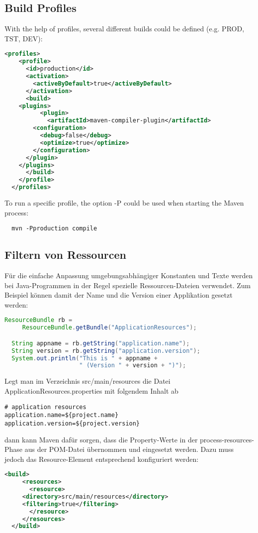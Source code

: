 \subsection{Build Profiles}
With the help of profiles, several different builds could be defined (e.g. PROD, TST, DEV):
\begin{lstlisting}[language=xml,
  morekeywords={profiles,profile,id,build,plugins,plugin,artifactId,
    configuration,debug,optimize}]
  <profiles>
    <profile>
      <id>production</id>
      <activation>
        <activeByDefault>true</activeByDefault>
      </activation>
      <build>
	<plugins>
          <plugin>
            <artifactId>maven-compiler-plugin</artifactId>
	    <configuration>
	      <debug>false</debug>
	      <optimize>true</optimize>
	    </configuration>
	  </plugin>
	</plugins>
      </build>
    </profile>
  </profiles>
\end{lstlisting}
To run a specific profile, the option -P could be used when starting the
Maven process:
\begin{lstlisting}
  mvn -Pproduction compile
\end{lstlisting}
\newslide
\subsection{Filtern von Ressourcen}
Für die einfache Anpassung umgebungsabhängiger Konstanten und Texte werden
bei Java-Programmen in der Regel spezielle Ressourcen-Dateien verwendet.
Zum Beispiel können damit der Name und die Version einer Applikation
gesetzt werden:
\begin{lstlisting}[language=java]
  ResourceBundle rb =
     ResourceBundle.getBundle("ApplicationResources");

  String appname = rb.getString("application.name");
  String version = rb.getString("application.version");
  System.out.println("This is " + appname +
                     " (Version " + version + ")");
\end{lstlisting}
\newslide
Legt man im Verzeichnis src/main/resources die Datei
ApplicationResources.properties mit folgendem Inhalt ab
\begin{lstlisting}
# application resources
application.name=${project.name}
application.version=${project.version}
\end{lstlisting}
dann kann Maven dafür sorgen, dass die Property-Werte in der
process-resources-Phase aus der POM-Datei übernommen und eingesetzt
werden.
\newslide
Dazu muss jedoch das
Resource-Element entsprechend konfiguriert werden:
\begin{lstlisting}[language=xml,
morekeywords={build,resources,resource,directory,filtering}]
   <build>
     <resources>
       <resource>
	 <directory>src/main/resources</directory>
	 <filtering>true</filtering>
       </resource>
     </resources>
  </build>
\end{lstlisting}
\newslide
%
